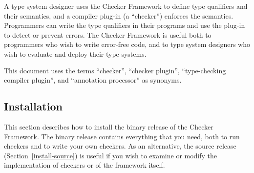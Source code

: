 A type system designer uses the Checker Framework to define type qualifiers
and their semantics, and a
compiler plug-in (a ``checker'') enforces the semantics.  Programmers can
write the type qualifiers in their programs and use the plug-in to detect
or prevent errors.  The Checker Framework is useful both to programmers who
wish to write error-free code, and to type system designers who wish to
evaluate and deploy their type systems.









This document uses the terms ``checker'', ``checker plugin'',
``type-checking compiler plugin'', and ``annotation processor'' as
synonyms.


\subsection{Installation\label{installation}}

This section describes how to install the binary release of the Checker
Framework.  The binary release contains everything that you need, both to
run checkers and to write your own checkers.  As an alternative, the source
release (Section~\ref{install-source}) is useful if you wish to examine or
modify the implementation of checkers or of the framework itself.

